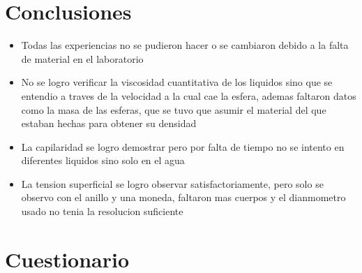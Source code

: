 \documentclass[11pt, letterpaper]{article}
\begin{document}
\section{Conclusiones}
\begin{itemize}
	\item Todas las experiencias no se pudieron hacer o se cambiaron debido a la falta de material en el laboratorio
	\item No se logro verificar la viscosidad cuantitativa de los liquidos sino que se entendio a traves de la velocidad a la cual cae la esfera, ademas faltaron datos como la masa de las esferas, que se tuvo que asumir el material del que estaban hechas para obtener su densidad
	\item La capilaridad se logro demostrar pero por falta de tiempo no se intento en diferentes liquidos sino solo en el agua
	\item La tension superficial se logro observar satisfactoriamente, pero solo se observo con el anillo y una moneda, faltaron mas cuerpos y el dianmometro usado no tenia la resolucion suficiente
\end{itemize}
\section{Cuestionario}
\end{document}
